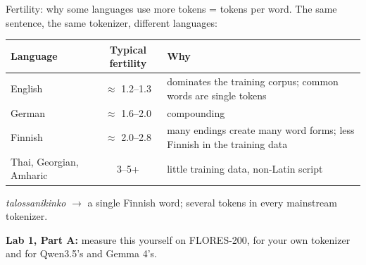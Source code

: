 \documentclass[aspectratio=169,10pt]{beamer}
\begin{document}
\begin{frame}{Fertility: why some languages use more tokens}
   = tokens per word. The same sentence, the same tokenizer,
  different languages:
  \vspace{0.5em}
  \centering
  \begin{tabular}{@{}l c L{7.0cm}@{}}
    \toprule
    \textbf{Language} & \textbf{Typical fertility} & \textbf{Why}\\
    \midrule
    English & $\approx$ 1.2--1.3 & dominates the training corpus; common words are single tokens\\
    German & $\approx$ 1.6--2.0 & compounding\\
    Finnish & $\approx$ 2.0--2.8 & many endings create many word forms; less Finnish in the training data\\
    Thai, Georgian, Amharic & 3--5+ & little training data, non-Latin script\\
    \bottomrule
  \end{tabular}

  \vspace{0.9em}
  \raggedright
  \textit{talossanikinko} $\to$ a single Finnish word; several tokens in every
  mainstream tokenizer.
  \vspace{0.3em}

  \textbf{Lab 1, Part A:} measure this yourself on FLORES-200, for your own
  tokenizer and for Qwen3.5's and Gemma 4's.
\end{frame}
\end{document}
